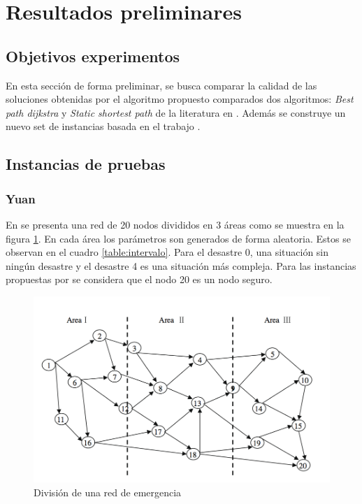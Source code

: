 \section{Resultados preliminares}
\subsection{Objetivos experimentos}

En esta sección de forma preliminar, se busca comparar la calidad de las soluciones obtenidas por el algoritmo propuesto comparados dos algoritmos: \textit{Best path dijkstra} y \textit{Static shortest path}  de la literatura en \cite{Yuan20091081}.
Además se construye un nuevo set de instancias basada en el trabajo \cite{forcael2014ant}.


\subsection{Instancias de pruebas}


\subsubsection{Yuan}
En \cite{Yuan20091081} se presenta una red de 20 nodos divididos en 3 áreas como se muestra en la figura \ref{area3}. En cada área los parámetros son generados de forma aleatoria. Estos se observan en el cuadro \ref{table:intervalo}. Para el desastre 0, una situación sin ningún desastre y el desastre 4 es una situación más compleja. Para las instancias propuestas por \cite{Yuan20091081} se considera que el nodo 20 es un nodo seguro.

\begin{figure}[H]
\centering
\includegraphics[scale=0.5]{images/areas.jpg}
\caption{División de una red de emergencia}\label{area3}

\end{figure}

